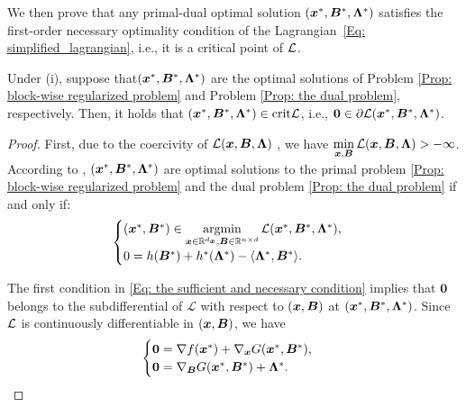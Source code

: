 We then prove that any primal-dual optimal solution $(\bm{x}^*, \bm{B}^*, \bm{\Lambda}^*)$ satisfies the first-order necessary optimality condition of the Lagrangian~\eqref{Eq: simplified_lagrangian}, i.e., it is a critical point of $\mathcal{L}$.
\begin{lemma}
\label{Lemma: Optimality condition}
    Under (i), suppose that\((\bm{x}^*, \bm{B}^*, \bm{\Lambda}^*)\) are the optimal solutions of Problem \eqref{Prop: block-wise regularized problem} and Problem \eqref{Prop: the dual problem}, respectively. Then, it holds that \((\bm{x}^*, \bm{B}^*, \bm{\Lambda}^*) \in \text{crit} \mathcal{L}\), i.e., \(\bm{0} \in \partial \mathcal{L}(\bm{x}^*, \bm{B}^*, \bm{\Lambda}^*)\).
\end{lemma} 
\begin{proof}
    First, due to the coercivity of $\mathcal{L}(\bm{x}, \bm{B}, \bm{\Lambda})$ , we have \(\min\limits_{\bm{x}, \bm{B}} \mathcal{L}(\bm{x}, \bm{B}, \bm{\Lambda}) > -\infty\). According to \cite[Theorem 2.158]{temporary-citekey-11039},
    $(\bm{x}^{*}, \bm{B}^{*}, \bm{\Lambda}^{*})$ are optimal solutions to the
    primal problem \eqref{Prop: block-wise regularized problem} and the dual problem
    \eqref{Prop: the dual problem} if and only if:
    \begin{align}
        \label{Eq: the sufficient and necessary condition}
        \begin{cases}
        (\bm{x}^{*}, \bm{B}^{*}) \in \operatorname*{\mathrm{argmin}}\limits_{\bm{x} \in \mathbb{R}^{d_{\bm{x}}}, \bm{B} \in \mathbb{R}^{n\times d}}\mathcal{L}(\bm{x}^{*}, \bm{B}^{*}, \bm{\Lambda}^{*}), \\ 
        0 = h(\bm{B}^{*}) + h^{*}(\bm{\Lambda}^{*}) - \langle \bm{\Lambda}^{*}, \bm{B}^{*}\rangle.
        \end{cases}
    \end{align}

    The first condition in \eqref{Eq: the sufficient and necessary condition} implies
    that $\bm{0}$ belongs to the subdifferential of $\mathcal{L}$ with respect to
    $(\bm{x}, \bm{B})$ at $(\bm{x}^{*}, \bm{B}^{*}, \bm{\Lambda}^{*})$. Since $\mathcal{L}$
    is continuously differentiable in $(\bm{x}, \bm{B})$, we have
    \begin{align}
        \label{Eq: the sufficient and necessary condition for primal}
        \begin{cases}
        \bm{0} = \nabla f(\bm{x}^{*}) + \nabla_{\bm{x}}G(\bm{x}^{*}, \bm{B}^{*}),\\ 
        \bm{0} = \nabla_{\bm{B}}G(\bm{x}^{*}, \bm{B}^{*}) + \bm{\Lambda}^{*}.
        \end{cases}
    \end{align}
    

\end{proof}
